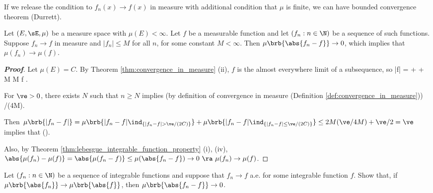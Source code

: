 If we release the condition to $f_n(x) \to f(x)$ in measure with additional condition that $\mu$ is finite, we can have bounded convergence theorem (Durrett\cite{Durrett_2004}).

\begin{theorem}\label{thm:bounded_convergence_finite_measure}
Let $(E,\sE,\mu)$ be a measure space with $\mu(E) <\infty$. Let $f$ be a measurable function and let $(f_n : n \in \N)$ be a sequence of such functions. Suppose $f_n \to f$ in measure and $|f_n| \leq M$ for all $n$, for some constant $M < \infty$. Then $\mu\brb{\abs{f_n - f}}\to 0$, which implies that $\mu(f_n)\to \mu(f)$.
\end{theorem}

\begin{proof}[\bf Proof]
Let $\mu(E) = C$. By Theorem \ref{thm:convergence_in_measure} (ii), $f$ is the almost everywhere limit of a subsequence, so
\be
|f| =  \leq {} +  \leq {} + M \to M \quad\ra\quad f .
\ee

For $\ve > 0$, there exists $N$ such that $n \geq N$ implies (by definition of convergence in measure (Definition \ref{def:convergence_in_measure}))
\be
\mu{} \leq \ve/(4M).
\ee

Then $\mu\brb{|f_n-f|} = \mu\brb{|f_n-f|\ind_{\{|f_n-f|>\ve/(2C)\}}}+\mu\brb{|f_n-f|\ind_{\{|f_n-f|\leq \ve/(2C)\}}}  \leq 2M(\ve/4M)+\ve/2 = \ve$ implies that
\be
\mu().
\ee

Also, by Theorem \ref{thm:lebesgue_integrable_function_property} (i), (iv), $\abs{\mu(f_n) - \mu(f)} = \abs{\mu(f_n - f)} \leq \mu(\abs{f_n-f})\to 0\ \ra\  \mu(f_n)\to \mu(f)$.
\end{proof}

\begin{theorem}
Let $(f_n:n\in\N)$ be a sequence of integrable functions and suppose that $f_n\to f$ a.e. for some integrable function $f$. Show that, if $\mu\brb{\abs{f_n}} \to \mu\brb{\abs{f}}$, then $\mu\brb{\abs{f_n - f}} \to 0$.
\end{theorem}

